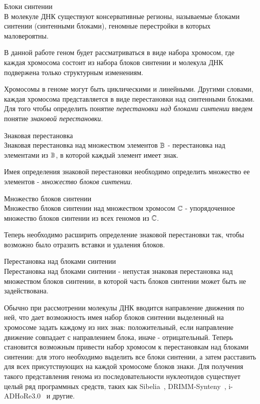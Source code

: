 \begin{define}{Блоки синтении} \\
  В молекуле ДНК существуют консервативные регионы, называемые блоками синтении (синтенными блоками),
  геномные перестройки в которых маловероятны.
\end{define}

В данной работе геном будет рассматриваться в виде набора хромосом,
где каждая хромосома состоит из набора блоков синтении и молекула ДНК подвержена только структурным изменениям.

Хромосомы в геноме могут быть циклическими и линейными.
Другими словами, каждая хромосома представляется в виде перестановки над синтенными блоками.
Для того чтобы определить понятие \textit{перестановки над блоками синтении} введем понятие \textit{знаковой перестановки}.
\begin{define}{Знаковая перестановка} \\
  Знаковая перестановка над множеством элементов $\mathbb{B}$ - перестановка над элементами из $\mathbb{B}$, в которой каждый элемент имеет знак.
\end{define}
Имея определения знаковой перестановки необходимо определить множество ее элементов - \textit{множество блоков синтении}.
\begin{define}{Множество блоков синтении} \\
  Множество блоков синтении над множеством хромосом $\mathbb{C}$ - упорядоченное множество блоков синтении из всех геномов из $\mathbb{C}$.
\end{define}
Теперь необходимо расширить определение знаковой перестановки так, чтобы возможно было отразить вставки и удаления блоков.
\begin{define}{Перестановка над блоками синтении} \\
  Перестановка над блоками синтении - непустая знаковая перестановка над множеством блоков синтении,
  в которой часть блоков синтении может быть не задействована.
\end{define}
Обычно при рассмотрении молекулы ДНК вводится направление движения по ней,
что дает возможность имея набор блоков синтении выделенный на хромосоме задать каждому из них знак:
положительный, если направление движение совпадает с направлением блока, иначе - отрицательный.
Теперь становится возможным привести набор хромосом к перестановкам над блоками синтении:
для этого необходимо выделить все блоки синтении, а затем расставить для всех присутствующих на каждой хромосоме блоков знаки.
Для получения такого представления генома из последовательности нуклеотидов существует целый ряд программных средств,
таких как Sibelia~\cite{minkin2013sibelia}, DRIMM-Synteny~\cite{pham2010drimm}, i-ADHoRe3.0~\cite{proost2012adhore} и другие.

